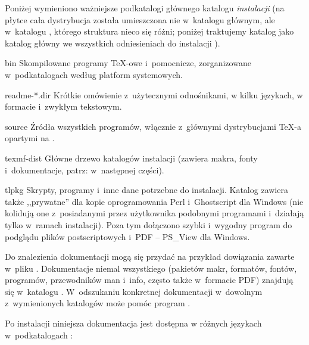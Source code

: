 \documentclass{article}
\begin{document}
Poniżej wymieniono ważniejsze podkatalogi głównego katalogu \emph{instalacji}
\TL (na płytce \TK{} \DVD{} cała dystrybucja \TL{} została umieszczona nie
w~katalogu głównym, ale w~katalogu , którego struktura nieco
się różni; poniżej traktujemy katalog  jako katalog główny
we wszystkich odniesieniach do instalacji \TL).


\begin{ttdescription}
\item[bin] Skompilowane programy \TeX-owe i~pomocnicze, zorganizowane
w~podkatalogach  według platform systemowych.

\item[readme-*.dir] Krótkie omówienie z~użytecznymi odnośnikami,
w kilku językach, w formacie \HTML{} i~zwykłym tekstowym.

\item[source] Źródła wszystkich programów, włącznie z~głównymi dystrybucjami
 \TeX-a opartymi na  \Webc{}.

\item[texmf-dist] Główne drzewo katalogów instalacji (zawiera makra,
 fonty i~dokumentacje, patrz:  w~następnej części).

\item[tlpkg] Skrypty, programy i~inne dane potrzebne do instalacji.
  Katalog zawiera także ,,prywatne'' dla \TL{} kopie oprogramowania Perl
  i~Ghostscript dla Windows (nie kolidują one z~posiadanymi przez użytkownika
  podobnymi programami i~działają tylko w~ramach instalacji). Poza tym
  dołączono szybki i~wygodny program do podglądu plików postscriptowych i~PDF
  -- PS\_View dla Windows.
\end{ttdescription}
 
Do znalezienia dokumentacji mogą się przydać na przykład dowiązania zawarte
w~pliku . Dokumentacje niemal wszystkiego (pakietów makr,
formatów, fontów, programów, przewodników man i~info, często także w~formacie
PDF) znajdują się w~katalogu . W~odszukaniu
konkretnej dokumentacji w~dowolnym z~wymienionych
katalogów może pomóc program .


Po instalacji niniejsza dokumentacja jest dostępna w różnych językach
w~podkatalogach :
\end{document}
